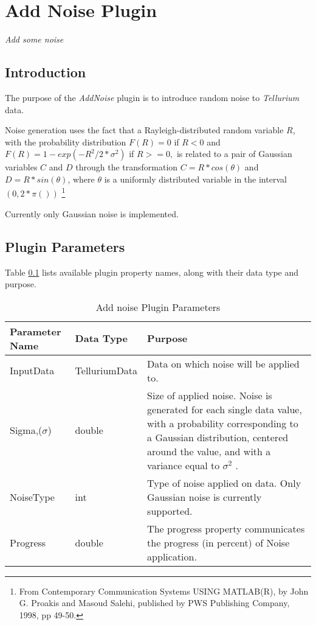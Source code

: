 \chapter*{Add Noise Plugin}
\setcounter{chapter}{1}
\emph{Add some noise}
\section{Introduction}
The purpose of the \emph{AddNoise} plugin is to introduce random noise to \emph{Tellurium} data.

Noise generation uses the fact that a Rayleigh-distributed random variable $R$, with
the probability distribution $F(R) = 0$ if $R < 0$ and $F(R) = 1 - exp(-R^2/2*\sigma^2)$ if $R >= 0, $
is related to a pair of Gaussian variables $C$ and $D$ through the transformation $C = R * cos(\theta)$ and
$D = R * sin(\theta)$, where $\theta$ is a uniformly distributed variable
in the interval $(0, 2*\pi())$ \footnote{From Contemporary Communication Systems
USING MATLAB(R), by John G. Proakis and Masoud Salehi, published by
PWS Publishing Company, 1998, pp 49-50.}

Currently only Gaussian noise is implemented.

\section{Plugin Parameters}
Table \ref{table:AddNoisePluginParameters} lists available plugin property names, along with their data type and purpose.


\begin{table}[ht]
\centering %
\begin{tabular}{l l p{7.5cm}} %

Parameter Name & Data Type & Purpose \\ [0.5ex] %
\hline %
InputData         		& 	TelluriumData & Data on which noise will be applied to. \\
Sigma,($\sigma$)      	& 	double & Size of applied noise. Noise is generated for each single data value, with a probability corresponding to a Gaussian distribution, centered around the value, and with a variance equal to $\sigma^2$ .\\
NoiseType      	& 	int    & Type of noise applied on data. Only Gaussian noise is currently supported. \\
Progress     	& 	double  & The progress property communicates the progress (in percent) of Noise application. \\

\hline %
\end{tabular}
\caption{Add noise Plugin Parameters}
\label{table:AddNoisePluginParameters}
\end{table}

